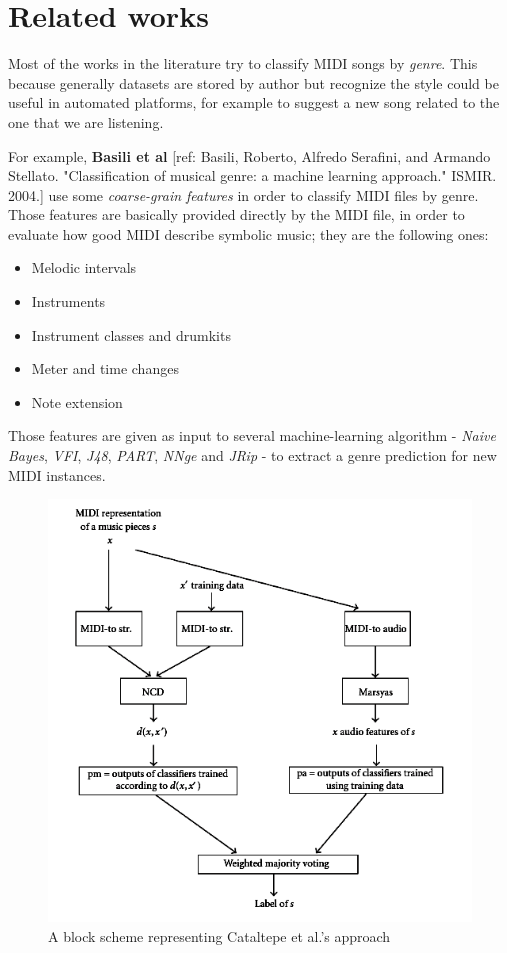\documentclass[a4paper]{article}
\begin{document}
	
	\section{Related works}
	\lettrine[nindent=0em,lines=2]{M}{}ost of the works in the literature try to classify MIDI songs by \textit{genre}. This because generally datasets are stored by author but recognize the style could be useful in automated platforms, for example to suggest a new song related to the one that we are listening. 
	
	For example, \textbf{Basili et al} [ref: Basili, Roberto, Alfredo Serafini, and Armando Stellato. "Classification of musical genre: a machine learning approach." ISMIR. 2004.] use some \textit{coarse-grain features} in order to classify MIDI files by genre. Those features are basically provided directly by the MIDI file, in order to evaluate how good MIDI describe symbolic music; they are the following ones:
	\begin{itemize}
		\item Melodic intervals
		\item Instruments
		\item Instrument classes and drumkits
		\item Meter and time changes
		\item Note extension
	\end{itemize}
	Those features are given as input to several machine-learning algorithm - \textit{Naive Bayes}, \textit{VFI}, \textit{J48}, \textit{PART}, \textit{NNge} and \textit{JRip} - to extract a genre prediction for new MIDI instances.
	
	\begin{figure}[!h]
		\centering
		\label{fig:audio_and_NCD}
		\includegraphics[scale=0.5]{misc/audio_and_ncd.png}
		\caption{A block scheme representing Cataltepe et al.'s approach}
	\end{figure}
	
\end{document}
